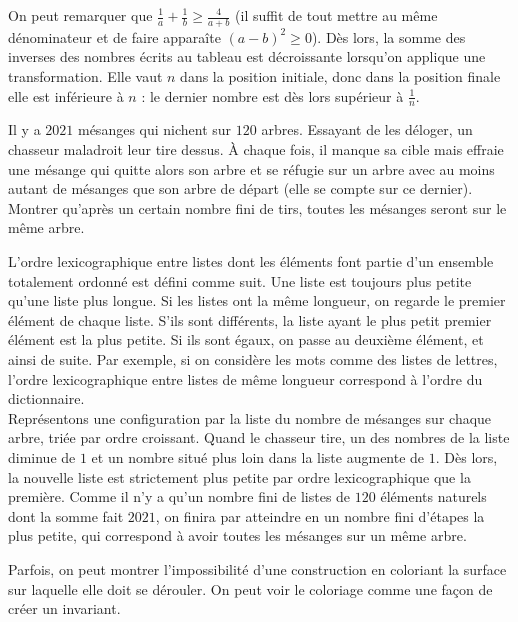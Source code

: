 \begin{sol}
On peut remarquer que $\frac1{a}+\frac1{b}\ge \frac{4}{a+b}$ (il suffit de tout mettre au même dénominateur et de faire apparaîte $(a-b)^2\ge0$). Dès lors, la somme des inverses des nombres écrits au tableau est décroissante lorsqu'on applique une transformation. Elle vaut $n$ dans la position initiale, donc dans la position finale elle est inférieure à $n$ : le dernier nombre est dès lors supérieur à $\frac1{n}$.
\end{sol}


\begin{exo}
Il y a $2021$ mésanges qui nichent sur $120$ arbres. Essayant de les déloger, un chasseur maladroit leur tire dessus. À chaque fois, il manque sa cible mais effraie une mésange qui quitte alors son arbre et se réfugie sur un arbre avec au moins autant de mésanges que son arbre de départ (elle se compte sur ce dernier). Montrer qu'après un certain nombre fini de tirs, toutes les mésanges seront sur le même arbre.
\end{exo}


\begin{sol}
L'ordre lexicographique entre listes dont les éléments font partie d'un ensemble totalement ordonné est défini comme suit. Une liste est toujours plus petite qu'une liste plus longue. Si les listes ont la même longueur, on regarde le premier élément de chaque liste. S'ils sont différents, la liste ayant le plus petit premier élément est la plus petite. Si ils sont égaux, on passe au deuxième élément, et ainsi de suite. Par exemple, si on considère les mots comme des listes de lettres, l'ordre lexicographique entre listes de même longueur correspond à l'ordre du dictionnaire.\\
Représentons une configuration par la liste du nombre de mésanges sur chaque arbre, triée par ordre croissant. Quand le chasseur tire, un des nombres de la liste diminue de $1$ et un nombre situé plus loin dans la liste augmente de $1$. Dès lors, la nouvelle liste est strictement plus petite par ordre lexicographique que la première. Comme il n'y a qu'un nombre fini de listes de $120$ éléments naturels dont la somme fait $2021$, on finira par atteindre en un nombre fini d'étapes la plus petite, qui correspond à avoir toutes les mésanges sur un même arbre.
\end{sol}


Parfois, on peut montrer l'impossibilité d'une construction en coloriant la surface sur laquelle elle doit se dérouler. On peut voir le coloriage comme une façon de créer un invariant.


